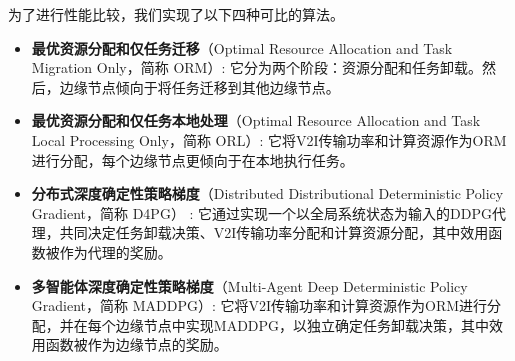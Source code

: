 \begin{table}[h]
\centering
{}
\label{table 4-2}
\end{table}
 
为了进行性能比较，我们实现了以下四种可比的算法。
\begin{itemize}
	\item \textbf{最优资源分配和仅任务迁移}（Optimal Resource Allocation and Task Migration Only，简称 ORM）: 它分为两个阶段：资源分配和任务卸载。然后，边缘节点倾向于将任务迁移到其他边缘节点。
	\item \textbf{最优资源分配和仅任务本地处理}（Optimal Resource Allocation and Task Local Processing Only，简称 ORL）: 它将V2I传输功率和计算资源作为ORM进行分配，每个边缘节点更倾向于在本地执行任务。
	\item \textbf{分布式深度确定性策略梯度}（Distributed Distributional Deterministic Policy Gradient，简称 D4PG） \cite{barth2018distributed}: 它通过实现一个以全局系统状态为输入的DDPG代理，共同决定任务卸载决策、V2I传输功率分配和计算资源分配，其中效用函数被作为代理的奖励。
	\item \textbf{多智能体深度确定性策略梯度}（Multi-Agent Deep Deterministic Policy Gradient，简称 MADDPG）\cite{zhang2021adaptive}: 它将V2I传输功率和计算资源作为ORM进行分配，并在每个边缘节点中实现MADDPG，以独立确定任务卸载决策，其中效用函数被作为边缘节点的奖励。
\end{itemize}

